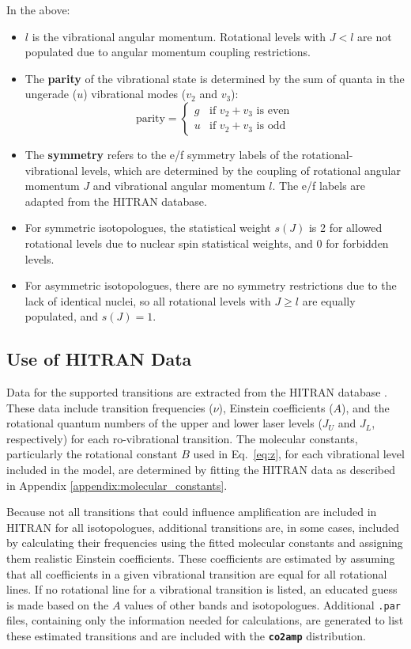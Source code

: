 In the above:

\begin{itemize}
    \item \(l\) is the vibrational angular momentum. Rotational levels with \( J < l \) are not populated due to angular momentum coupling restrictions.
    \item The \textbf{parity} of the vibrational state is determined by the sum of quanta in the ungerade (\( u \)) vibrational modes (\( v_2 \) and \( v_3 \)):
    \[
    \text{parity} = \begin{cases}
    g & \text{if } v_2 + v_3 \text{ is even} \\
    u & \text{if } v_2 + v_3 \text{ is odd}
    \end{cases}
    \]
    \item The \textbf{symmetry} refers to the e/f symmetry labels of the rotational-vibrational levels, which are determined by the coupling of rotational angular momentum \( J \) and vibrational angular momentum \( l \). The e/f labels are adapted from the HITRAN database.
    \item For symmetric isotopologues, the statistical weight \( s(J) \) is 2 for allowed rotational levels due to nuclear spin statistical weights, and 0 for forbidden levels.
    \item For asymmetric isotopologues, there are no symmetry restrictions due to the lack of identical nuclei, so all rotational levels with \( J \geq l \) are equally populated, and \( s(J) = 1 \).
\end{itemize}



\subsection{Use of HITRAN Data}

Data for the supported transitions are extracted from the HITRAN database \cite{Gordon-2022}. These data include transition frequencies ($\nu$), Einstein coefficients ($A$), and the rotational quantum numbers of the upper and lower laser levels ($J_U$ and $J_L$, respectively) for each ro-vibrational transition. The molecular constants, particularly the rotational constant $B$ used in Eq.~\ref{eq:z}, for each vibrational level included in the model, are determined by fitting the HITRAN data as described in Appendix \ref{appendix:molecular_constants}.

Because not all transitions that could influence amplification are included in HITRAN for all isotopologues, additional transitions are, in some cases, included by calculating their frequencies using the fitted molecular constants and assigning them realistic Einstein coefficients. These coefficients are estimated by assuming that all coefficients in a given vibrational transition are equal for all rotational lines. If no rotational line for a vibrational transition is listed, an educated guess is made based on the $A$ values of other bands and isotopologues. Additional \texttt{.par} files, containing only the information needed for calculations, are generated to list these estimated transitions and are included with the \textbf{\texttt{co2amp}} distribution.

